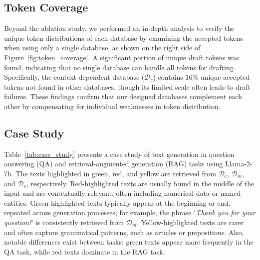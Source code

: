 \subsection{Token Coverage}



Beyond the ablation study, we performed an in-depth analysis to verify the unique token distributions of each database by examining the accepted tokens when using only a single database, as shown on the right side of Figure~\ref{fig:token_coverage}. A significant portion of unique draft tokens was found, indicating that no single database can handle all tokens for drafting. Specifically, the context-dependent database (\(\mathcal{D}_c\)) contains 16\% unique accepted tokens not found in other databases, though its limited scale often leads to draft failures. These findings confirm that our designed databases complement each other by compensating for individual weaknesses in token distribution.


\subsection{Case Study}

Table~\ref{tab:case_study} presents a case study of text generation in question answering (QA) and retrieval-augmented generation (RAG) tasks using Llama-2-7b. The texts highlighted in green, red, and yellow are retrieved from \(\mathcal{D}_c\), \(\mathcal{D}_m\), and \(\mathcal{D}_s\), respectively. Red-highlighted texts are usually found in the middle of the input and are contextually relevant, often including numerical data or named entities. Green-highlighted texts typically appear at the beginning or end, repeated across generation processes; for example, the phrase ‘\textit{Thank you for your question!}’ is consistently retrieved from \(\mathcal{D}_m\). Yellow-highlighted texts are rarer and often capture grammatical patterns, such as articles or prepositions. Also, notable differences exist between tasks: green texts appear more frequently in the QA task, while red texts dominate in the RAG task.



